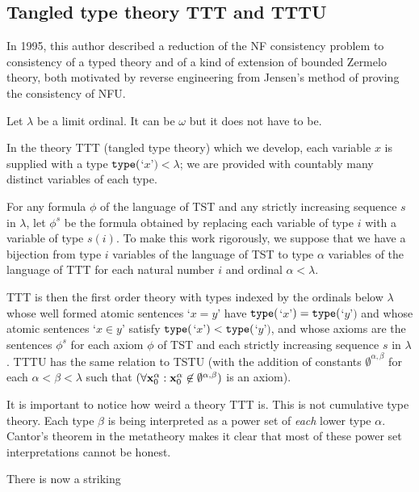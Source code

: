 \documentclass[12pt]{article}
\begin{document}
\newpage

\subsection{Tangled type theory TTT and TTTU}

In 1995, this author described a reduction of the NF consistency problem to consistency of a typed theory and of a kind of extension of bounded Zermelo theory, both motivated by reverse engineering from Jensen's method of proving the consistency of NFU.

Let $\lambda$ be a limit ordinal.  It can be $\omega$ but it does not have to be.  

In the theory TTT (tangled type theory) which we develop, each variable $x$ is supplied with a type ${\tt type}($`$x$'$) <\lambda$;  we are provided with countably many distinct variables of each type.

For any formula $\phi$ of the language of TST and any strictly increasing sequence $s$ in $\lambda$, let $\phi^s$ be the formula obtained by replacing each variable
of type $i$ with a variable of type $s(i)$.  To make this work rigorously, we suppose that we have a bijection from type $i$ variables of the language of TST to type $\alpha$ variables
of the language of TTT for each natural number $i$ and ordinal $\alpha<\lambda$.

TTT is then the first order theory with types indexed by the ordinals below $\lambda$ whose well formed atomic sentences `$x=y$' have ${\tt type}($`$x$'$) = {\tt type}($`$y$'$)$ and whose atomic sentences `$x \in y$' satisfy ${\tt type}($`$x$'$) < {\tt type}($`$y$'$)$, and whose axioms are the sentences $\phi^s$ for each axiom $\phi$ of TST and each strictly increasing sequence $s$ in $\lambda$.  TTTU has the same relation to TSTU (with the addition of constants $\emptyset^{\alpha,\beta}$ for each $\alpha<\beta<\lambda$  such that $(\forall {\bf x}_0^{\alpha} :{\bf x}_0^{\alpha}\not\in \emptyset^{\alpha,\beta})$ is an axiom).

It is important to notice how weird a theory TTT is.  This is not cumulative type theory.  Each type $\beta$ is being interpreted as a power set of {\em each\/} lower type $\alpha$.  Cantor's theorem in the metatheory makes it clear that most of these power set interpretations cannot be honest.

There is now a striking
\end{document}
